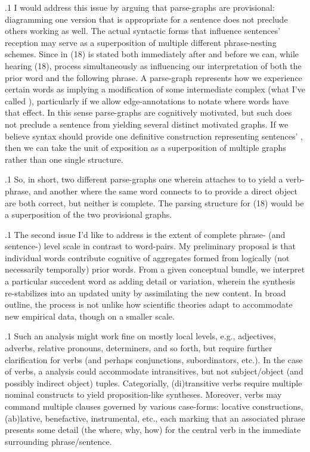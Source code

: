 \documentclass[11pt, twocolumn]{article}
\begin{document}
\p.1{%
\:\+I would address this issue by arguing that parse-graphs are provisional:
diagramming one version that is appropriate for a sentence does not
preclude others working as well. \> The actual syntactic forms that
influence sentences' reception may serve as a superposition
of multiple different phrase-nesting schemes. \> Since 
in \exsRef(18) is stated both immediately after  and before
 we can, while hearing \exsRef(18), process 
simultaneously as influencing our interpretation of both the
prior word and the following phrase.  A parse-graph represents
how we experience certain words as implying a modification of
some intermediate complex (what I've called ),
particularly if we allow edge-annotations to notate where
words have that  effect. \> In 
this sense parse-graphs are cognitively motivated,
but such does not preclude a sentence from yielding several
distinct motivated graphs. \> If we believe syntax should
provide one definitive construction representing sentences'
, then we can take the unit of exposition
as a superposition of multiple graphs rather
than one single structure.\<\;
} %

\p.1{%
So, in short, two different parse-graphs \mdash{} one wherein  attaches
to  to yield a verb-phrase, and another where the same word
connects to  to provide a direct object \mdash{} are both
correct, but neither is complete. \> The  parsing
structure for \exsRef(18) would be a superposition of the two provisional graphs.\<\;
} %

\p.1{%
\:\+The second issue I'd like to address is the extent of complete phrase-
(and sentence-) level scale in contrast to 
word-pairs. \> My preliminary proposal is that 
individual words contribute
cognitive  of aggregates formed from logically
(not necessarily temporally) prior words. \> From a
given conceptual bundle, we
interpret a particular succedent word as adding detail or
variation, wherein the synthesis re-stabilizes into
an updated unity by assimilating the new 
content. \> In broad outline, the process is not unlike
how scientific theories adapt to accommodate new
empirical data, though on a smaller scale.\<\;
} %

\p.1{%
Such an analysis might work fine on mostly
local levels, e.g., adjectives, adverbs, relative
pronouns, determiners, and so forth, but require
further clarification for verbs (and perhaps conjunctions,
subordinators, etc.). \> In the case of verbs, a
 analysis could accommodate intransitives,
but not subject/object (and possibly indirect object)
tuples. \> Categorially, (di)transitive verbs
require multiple nominal constructs to
yield proposition-like syntheses. \> Moreover,
verbs may command multiple clauses governed
by various case-forms: locative constructions,
(ab)lative, benefactive, instrumental, etc., each marking
that an associated phrase presents some detail
(the where, why, how) for the central verb
in the immediate surrounding phrase/sentence.\<\;
} %
\end{document}
